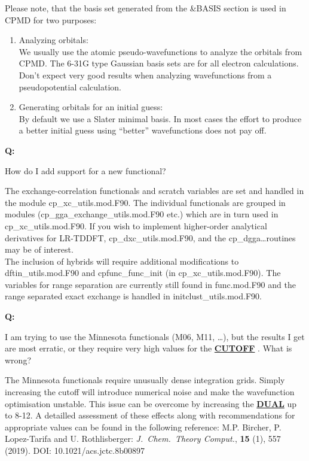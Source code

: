 \documentclass[twoside,10pt,titlepage,a4paper]{article}
\newcommand{\referto}[2]{\hyperlink{#1}{#2}}
\newcommand{\reflabel}[1]{\hypertarget{#1}}
\newcommand{\referto}[2]{\htmlref{#2}{#1}}
\newcommand{\reflabel}[1]{\label{#1}}
\newcommand{\faqquestion}[1]{\vspace{2ex}\reflabel{faq#1}{{\bf Q:\ }}}
\newcommand{\faqanswer}{\vspace{1ex}{{\bf A:\ }}}
\newcommand{\refkeyword}[1]{%
\referto{#1}{\textbf{#1}}%
\index{#1}%
}%
\begin{document}
Please note, that the basis set generated from the \&BASIS
section is used in CPMD for two purposes:
\begin{enumerate}
\item Analyzing orbitals:\\
   We usually use the atomic pseudo-wavefunctions to analyze
   the orbitals from CPMD. The 6-31G type Gaussian basis
   sets are for all electron calculations. Don't expect
   very good results when analyzing wavefunctions from a
   pseudopotential calculation.
\item Generating orbitals for an initial guess:\\
   By default we use a Slater minimal basis. In most
   cases the effort to produce a better initial guess
   using ``better'' wavefunctions does not pay off.
\end{enumerate}
%

\faqquestion{newdft}
How do I add support for a new functional?

\faqanswer
The exchange-correlation functionals and scratch variables
are set and handled in the module
cp\_xc\_utils.mod.F90. The individual functionals are grouped in modules
(cp\_gga\_exchange\_utils.mod.F90 etc.{}) which are in turn used in
cp\_xc\_utils.mod.F90. If you wish to implement higher-order analytical derivatives
for LR-TDDFT, cp\_dxc\_utils.mod.F90, and the cp\_dgga\dots routines may be of interest. \\
The inclusion of hybrids will require additional modifications to dftin\_utils.mod.F90 and
cpfunc\_func\_init (in cp\_xc\_utils.mod.F90). The variables for
range separation are currently still found in func.mod.F90 and the range separated exact exchange
is handled in initclust\_utils.mod.F90.
%

\faqquestion{minnesotaconv}
I am trying to use the Minnesota functionals (M06, M11, \dots), but the results I get are most erratic,
or they require very high values for the \refkeyword{CUTOFF}.
What is wrong?

\faqanswer
The Minnesota functionals require unusually dense integration grids. Simply increasing the cutoff will
introduce numerical noise and make the wavefunction optimisation unstable. This issue can be overcome by
increasing the \refkeyword{DUAL} up to 8-12. A detailled assessment of these effects along with recommendations
for appropriate values can be found in the following reference: M.P. Bircher, P. Lopez-Tarifa and U. Rothlisberger:
\emph{J.\ Chem.\ Theory Comput.}, \textbf{15} (1), 557 (2019). DOI: 10.1021/acs.jctc.8b00897
\end{document}
